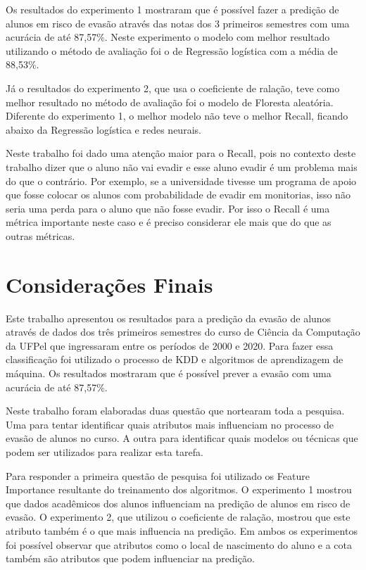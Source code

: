 \documentclass[diss,capa]{texufpel}
\begin{document}
Os resultados do experimento 1 mostraram que é possível fazer a predição de alunos em risco de evasão através das notas dos 3 primeiros semestres com uma acurácia de até 87,57\%.
Neste experimento o modelo com melhor resultado utilizando o método de avaliação foi o de Regressão logística com a média de 88,53\%.

Já o resultados do experimento 2, que usa o coeficiente de ralação, teve como melhor resultado no método de avaliação foi o modelo de Floresta aleatória.
Diferente do experimento 1, o melhor modelo não teve o melhor Recall, ficando abaixo da Regressão logística e redes neurais.

Neste trabalho foi dado uma atenção maior para o Recall, pois no contexto deste trabalho dizer que o aluno não vai evadir e esse aluno evadir é um problema mais do que o contrário.
Por exemplo, se a universidade tivesse um programa de apoio que fosse colocar os alunos com probabilidade de evadir em monitorias, isso não seria uma perda para o aluno que não fosse evadir.
Por isso o Recall é uma métrica importante neste caso e é preciso considerar ele mais que do que as outras métricas.


\chapter{Considerações Finais}

Este trabalho apresentou os resultados para a predição da evasão de alunos através de dados dos três primeiros semestres do curso de Ciência da Computação da UFPel que ingressaram entre os períodos de 2000 e 2020.
Para fazer essa classificação foi utilizado o processo de KDD e algoritmos de aprendizagem de máquina.
Os resultados mostraram que é possível prever a evasão com uma acurácia de até 87,57\%.

Neste trabalho foram elaboradas duas questão que nortearam toda a pesquisa. Uma para tentar identificar quais atributos mais influenciam no processo de evasão de alunos no curso. A outra para identificar quais modelos ou técnicas que podem ser utilizados para realizar esta tarefa.

Para responder a primeira questão de pesquisa foi utilizado os Feature Importance resultante do treinamento dos algoritmos. O experimento 1 mostrou que dados acadêmicos dos alunos influenciam na predição de alunos em risco de evasão. O experimento 2, que utilizou o coeficiente de ralação, mostrou que este atributo também é o que mais influencia na predição. Em ambos os experimentos foi possível observar que atributos como o local de nascimento do aluno e a cota também são atributos que podem influenciar na predição.
\end{document}
